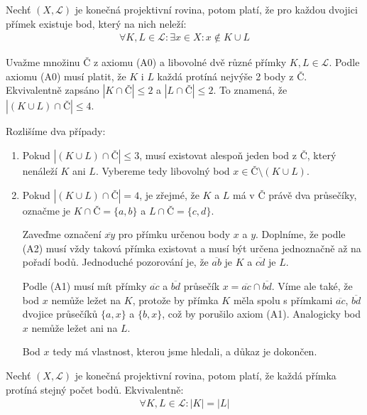 \begin{t_lemma}
  Nechť $(X, \mathcal{L})$ je konečná projektivní rovina, potom platí, že pro každou dvojici přímek existuje bod, který na nich neleží:
  \begin{align*}
    \forall K, L\in\mathcal{L} : \exists x\in X : x\notin K\cup L
  \end{align*}
\end{t_lemma}
\begin{t_proof}
  Uvažme množinu $Č$ z axiomu (A0) a libovolné dvě různé přímky $K, L\in\mathcal{L}$. Podle axiomu (A0) musí platit, že $K$ i $L$ každá protíná nejvýše 2 body z $Č$. Ekvivalentně zapsáno $|K\cap Č|\leq 2$ a $|L\cap Č|\leq 2$. To znamená, že $|(K\cup L)\cap Č|\leq 4$.
  
  Rozlišíme dva případy:
  \begin{enumerate}
    \item Pokud $|(K\cup L)\cap Č|\leq 3$, musí existovat alespoň jeden bod z $Č$, který nenáleží $K$ ani $L$. Vybereme tedy libovolný bod $x\in Č\setminus(K\cup L)$.
    \item Pokud $|(K\cup L)\cap Č|= 4$, je zřejmé, že $K$ a $L$ má v $Č$ právě dva průsečíky, označme je $K\cap Č=\{a,b\}$ a $L\cap Č=\{c,d\}$.
    
    Zaveďme označení $\overline{xy}$ pro přímku určenou body $x$ a $y$. Doplníme, že podle (A2) musí vždy taková přímka existovat a musí být určena jednoznačně až na pořadí bodů. Jednoduché pozorování je, že $\overline{ab}$ je $K$ a $\overline{cd}$ je $L$.
    
    Podle (A1) musí mít přímky $\overline{ac}$ a $\overline{bd}$ průsečík $x=\overline{ac}\cap\overline{bd}$. Víme ale také, že bod $x$ nemůže ležet na $K$, protože by přímka $K$ měla spolu s přímkami $\overline{ac}$, $\overline{bd}$ dvojice průsečíků $\{a,x\}$ a $\{b,x\}$, což by porušilo axiom (A1). Analogicky bod $x$ nemůže ležet ani na $L$.
    
    Bod $x$ tedy má vlastnost, kterou jsme hledali, a důkaz je dokončen.
  \end{enumerate}
\end{t_proof}

\begin{t_theorem}
  Nechť $(X, \mathcal{L})$ je konečná projektivní rovina, potom platí, že každá přímka protíná stejný počet bodů. Ekvivalentně:
  \begin{align*}
    \forall K, L\in\mathcal{L}:|K|=|L|
  \end{align*}
\end{t_theorem}

